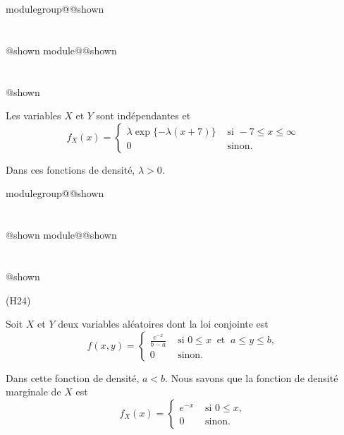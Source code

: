 \documentclass{Evaluation}
\makeatletter
\newcommand{\currentmodulekey}{}
\newcommand{\currentmoduletitle}{}
\newcommand{\currentgroupkey}{}
\newcommand{\currentgrouptitle}{}
\newcommand{\showmoduleifneeded}{%
  \ifx\currentgroupkey\empty\else
    \expandafter\ifx\csname modulegroup@\currentgroupkey @shown\endcsname\relax
      \section*{\currentgrouptitle}%
      \expandafter\gdef\csname modulegroup@\currentgroupkey @shown\endcsname{1}%
    \fi
  \fi
  \expandafter\ifx\csname module@\currentmodulekey @shown\endcsname\relax
    \section*{\currentmoduletitle}%
    \expandafter\gdef\csname module@\currentmodulekey @shown\endcsname{1}%
  \fi
}
\newenvironment{A23}{\showmoduleifneeded}{}
\newenvironment{H24}{\showmoduleifneeded}{}
\makeatother
\begin{document}
\begin{questions}
\begin{A23}
Les variables $X$ et $Y$ sont indépendantes et
    $$f_X(x)=\left\{
			\begin{array}{ll}
		\displaystyle	\lambda\exp\{-\lambda (x+7)\}  & \mbox{ si } -7\leq x\leq \infty\\
			0  & \mbox{ sinon. } 
			\end{array}
			\right.$$

Dans ces fonctions de densité, $\lambda > 0$.
\end{A23}

\begin{H24}
\question (H24)

Soit $X$ et $Y$ deux variables aléatoires dont la loi conjointe est 
$$f(x,y)=\left\{
			\begin{array}{ll}
   \displaystyle \frac{e^{-x}}{b-a}  & \mbox{ si } 0\leq x \ \mbox{ et } \ a\leq y\leq b, \\
    0  & \mbox{ sinon. }
			\end{array}
			\right.$$

Dans cette fonction de densité, $a<b$. Nous savons que la fonction de densité marginale de $X$ est
$$f_X(x)=\left\{
			\begin{array}{ll}
   \displaystyle e^{-x} & \mbox{ si } 0\leq x ,\\
    0  & \mbox{ sinon. }
			\end{array}
			\right.$$


\end{H24}
\end{questions}
\end{document}
